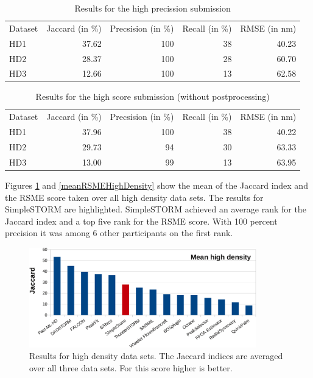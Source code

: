 \begin{table}
\caption{Results for the high precission submission}
\begin{tabular}{lrrrr}
Dataset&Jaccard (in \%)&Precsision (in \%)& Recall (in \%) & RMSE (in nm)\\
HD1&37.62&100&38&40.23\\
HD2&28.37&100&28&60.70\\
HD3&12.66&100&13&62.58
\end{tabular}\label{reshd2}
\end{table}
\begin{table}
\caption{Results for the high score submission (without postprocessing)}
\begin{tabular}{lrrrr}
Dataset&Jaccard (in \%)&Precsision (in \%)& Recall (in \%) & RMSE (in nm)\\
HD1&37.96&100&38&40.22\\
HD2&29.73&94&30&63.33\\
HD3&13.00&99&13&63.95
\end{tabular}\label{reshd3}
\end{table}
Figures \ref{meanJaccardHighDensity} and \ref{meanRSMEHighDensity} show the mean of the Jaccard index and the RSME score taken over all high density data sets. The results for SimpleSTORM are highlighted. SimpleSTORM achieved an average rank for the Jaccard index and a top five rank for the RSME score. With 100 percent precision it was among 6 other participants on the first rank.


\begin{figure}
\centering
\includegraphics[width = 0.88\textwidth]{pictures/diagrammsChallenge/MeanHighDensityJaccardCropped.pdf}
	\caption{Results for high density data sets. The Jaccard indices are averaged over all three data sets. For this score higher is better.}
	\label{meanJaccardHighDensity}
\end{figure}

